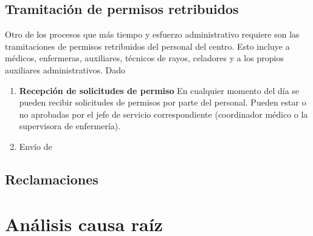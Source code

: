 \subsection{Tramitación de permisos retribuidos}

Otro de los procesos que más tiempo y esfuerzo administrativo requiere son las tramitaciones de permisos retribuidos del personal del centro. Esto incluye a médicos, enfermeras, auxiliares, técnicos de rayos, celadores y a los propios auxiliares administrativos. Dado 

\begin{enumerate}
    \item \textbf{Recepción de solicitudes de permiso} En cualquier momento del día se pueden recibir solicitudes de permisos por parte del personal. Pueden estar o no aprobadas por el jefe de servicio correspondiente (coordinador médico o la supervisora de enfermería). 
    \item Envío de 
\end{enumerate}

\subsection{Reclamaciones}

\section{Análisis causa raíz}